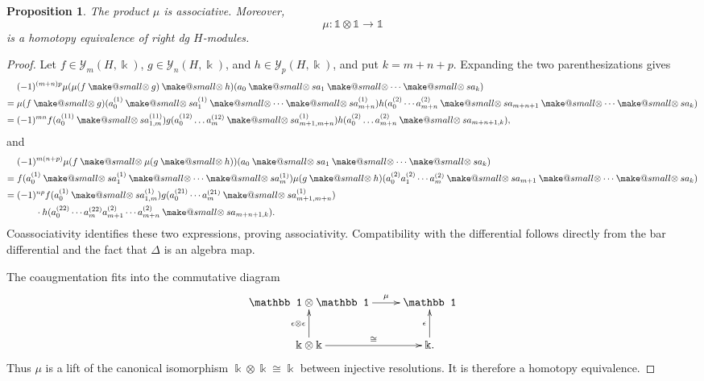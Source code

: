 \documentclass[a4paper, 11pt]{amsart}
\makeatletter
\newtheorem{prop}[thm]{Proposition}
\theoremstyle{definition}
\theoremstyle{remark}
\numberwithin{equation}{section}
\newcommand{\Y}{\mathcal{Y}}
\newcommand{\smallotimes}{\mathbin{\mathpalette\make@small\otimes}}
\newcommand{\make@small}[2]{%
  \vcenter{\hbox{%
    $\m@th\ifx#1\displaystyle\scriptstyle\else\ifx#1\textstyle\scriptstyle
     \else\scriptscriptstyle\fi\fi#2$%
  }}%
}
\makeatother
\begin{document}
\begin{prop}\label{prop:yhkasso}
The product $\mu$ is associative. Moreover,
\[
\mu\colon\mathbb 1\otimes\mathbb 1\longrightarrow\mathbb 1
\]
is a homotopy equivalence of right dg $H$-modules.
\end{prop}
\begin{proof}
Let $f\in\Y_m(H,\Bbbk)$, $g\in\Y_n(H,\Bbbk)$, and $h\in\Y_p(H,\Bbbk)$, and put $k=m+n+p$. Expanding the two parenthesizations gives
\begin{align*}
&(-1)^{(m+n)p}\mu(\mu(f\smallotimes g)\smallotimes h)
 (a_0\smallotimes sa_1\smallotimes\dotsb\smallotimes sa_k)\\
={}&\mu(f\smallotimes g)(a_0^{(1)}\smallotimes sa_1^{(1)}\smallotimes\dotsb\smallotimes sa_{m+n}^{(1)})
 h(a_0^{(2)}\dotsb a_{m+n}^{(2)}\smallotimes sa_{m+n+1}\smallotimes\dotsb\smallotimes sa_k)\\
={}&(-1)^{mn}f(a_0^{(11)}\smallotimes sa_{1,m}^{(11)})
 g(a_0^{(12)}\dotsc a_m^{(12)}\smallotimes sa_{m+1,m+n}^{(1)})
 h(a_0^{(2)}\dotsc a_{m+n}^{(2)}\smallotimes sa_{m+n+1,k}),
\end{align*}
and
\begin{align*}
&(-1)^{m(n+p)}\mu(f\smallotimes\mu(g\smallotimes h))
 (a_0\smallotimes sa_1\smallotimes\dotsb\smallotimes sa_k)\\
={}&f(a_0^{(1)}\smallotimes sa_1^{(1)}\smallotimes\dotsb\smallotimes sa_m^{(1)})
 \mu(g\smallotimes h)(a_0^{(2)}a_1^{(2)}\dotsb a_m^{(2)}\smallotimes sa_{m+1}\smallotimes\dotsb\smallotimes sa_k)\\
={}&(-1)^{np}f(a_0^{(1)}\smallotimes sa_{1,m}^{(1)})
 g(a_0^{(21)}\dotsb a_m^{(21)}\smallotimes sa_{m+1,m+n}^{(1)})\\
&\qquad\cdot
 h(a_0^{(22)}\dotsb a_m^{(22)}a_{m+1}^{(2)}\dotsb a_{m+n}^{(2)}
 \smallotimes sa_{m+n+1,k}).
\end{align*}
Coassociativity identifies these two expressions, proving associativity. Compatibility with the differential follows directly from the bar differential and the fact that $\Delta$ is an algebra map.

The coaugmentation fits into the commutative diagram
\[
\xymatrix{
\mathbb 1\otimes\mathbb 1\ar[r]^-{\mu} & \mathbb 1\\
\Bbbk\otimes\Bbbk\ar[r]^-{\cong}\ar[u]^-{\epsilon\otimes\epsilon} & \Bbbk\ar[u]^-{\epsilon}.
}
\]
Thus $\mu$ is a lift of the canonical isomorphism $\Bbbk\otimes\Bbbk\cong\Bbbk$ between injective resolutions. It is therefore a homotopy equivalence.
\end{proof}
\end{document}
